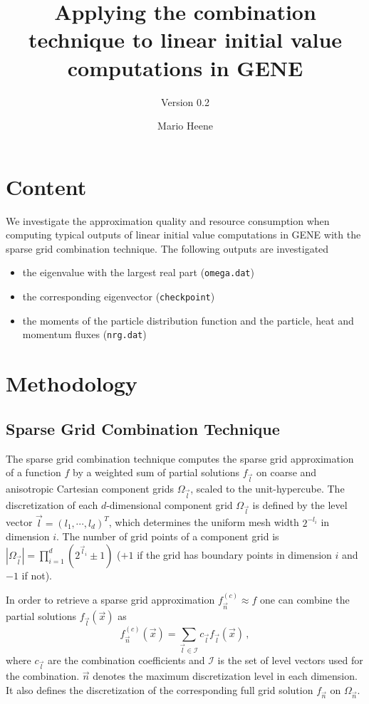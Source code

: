 \documentclass{scrartcl}
\title{Applying the combination technique to linear initial value computations in GENE}
\subtitle{Version 0.2}
\author{Mario Heene}
\begin{document}
\maketitle

\section{Content}
We investigate the approximation quality and resource consumption when computing typical outputs of linear initial value computations in GENE with the sparse grid combination technique. The following outputs are investigated
\begin{itemize}
	\item the eigenvalue with the largest real part (\texttt{omega.dat})
	\item the corresponding eigenvector (\texttt{checkpoint})
	\item the moments of the particle distribution function and the particle, heat and momentum fluxes (\texttt{nrg.dat})
\end{itemize}

\section{Methodology}
\subsection{Sparse Grid Combination Technique}

The sparse grid combination technique computes the sparse grid approximation of a function $f$ by a weighted sum of partial solutions $f_{\vec{l}}$ on coarse and anisotropic Cartesian component grids $\Omega_{\vec l}$, scaled to the unit-hypercube. 
The discretization of each $d$-dimensional component grid $\Omega_{\vec l}$ is defined by the level vector $\vec l = (l_1,\cdots,l_d)^T$, 
which determines the uniform mesh width $2^{-l_i}$ in dimension $i$.
The number of grid points of a component grid is $|\Omega_{\vec l}| = \prod_{i=1}^d (2^{\vec{l}_i} \pm 1)$ 
($+1$ if the grid has boundary points in dimension $i$ and $-1$ if not).

In order to retrieve a sparse grid approximation $f_{\vec n}^{(c)} \approx f$ one can combine the partial solutions $f_{\vec{l}}(\vec{x})$ as 
\begin{equation}
	f_{\vec n}^{(c)}(\vec x) = \sum_{\vec l \in \mathcal I}c_{\vec l}f_{\vec l}(\vec x)\,,
	\label{eq:combination}
\end{equation}
where $c_{\vec l}$ are the combination coefficients and $\mathcal I$ is the set of level vectors used for the combination. $\vec n$ denotes the maximum discretization level in each dimension. It also defines the discretization of the corresponding full grid solution $f_{\vec n}$ on $\Omega_{\vec n}$.
\end{document}
